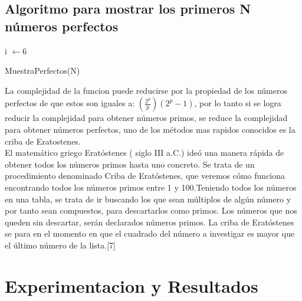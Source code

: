 \documentclass[spanish]{article}
\begin{document}
	\subsection{Algoritmo para mostrar los primeros N números perfectos}
	\begin{algorithm}[H]
		i $\gets$6\;
		\caption{MuestraPerfectos(N)}
	\end{algorithm}
	La complejidad de la funcion puede reducirse por la propiedad de los números perfectos de que estos son iguales a: $(\frac{2^p}{p})(2^p-1)$, por lo tanto si se logra reducir la complejidad para obtener números primos, se reduce la complejidad para obtener números perfectos, uno de los métodos mas rapidos conocidos es la criba de Eratostenes.\\
	El matemático griego Eratóstenes ( siglo III a.C.) ideó una manera rápida de obtener todos los números primos hasta uno concreto. Se trata de un procedimiento denominado Criba de Eratóstenes, que veremos cómo funciona encontrando todos los números primos entre 1 y 100.Teniendo todos los números en una tabla, se trata de ir buscando los que sean múltiplos de algún número y por tanto sean compuestos, para descartarlos como primos. Los números que nos queden sin descartar, serán declarados números primos. La criba de Eratóstenes se para en el momento en que el cuadrado del número a investigar es mayor que el último número de la lista.[7]
	\section{Experimentacion y Resultados}
\end{document}
